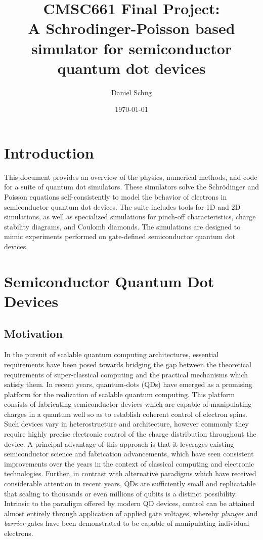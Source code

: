 \documentclass{article}
\title{CMSC661 Final Project: \\ A Schrodinger-Poisson based simulator for semiconductor quantum dot devices}
\author{Daniel Schug}
\date{\today}
\begin{document}
\maketitle
\tableofcontents
\newpage

\section{Introduction}
This document provides an overview of the physics, numerical methods, and code for a suite of quantum dot simulators. These simulators solve the Schrödinger and Poisson equations self-consistently to model the behavior of electrons in semiconductor quantum dot devices. The suite includes tools for 1D and 2D simulations, as well as specialized simulations for pinch-off characteristics, charge stability diagrams, and Coulomb diamonds. The simulations are designed to mimic experiments performed on gate-defined semiconductor quantum dot devices.

\section{Semiconductor Quantum Dot Devices}
\subsection{Motivation}
In the pursuit of scalable quantum computing architectures, essential requirements have been posed towards bridging the gap between the theoretical requirements of super-classical computing and the practical mechanisms which satisfy them. In recent years, quantum-dots (QDs) have emerged as a promising platform for the realization of scalable quantum computing. This platform consists of fabricating semiconductor devices which are capable of manipulating charges in a quantum well so as to establish coherent control of electron spins. Such devices vary in heterostructure and architecture, however commonly they require highly precise electronic control of the charge distribution throughout the device. A principal advantage of this approach is that it leverages existing semiconductor science and fabrication advancements, which have seen consistent improvements over the years in the context of classical computing and electronic technologies. Further, in contrast with alternative paradigms which have received considerable attention in recent years, QDs are sufficiently small and replicatable that scaling to thousands or even millions of qubits is a distinct possibility. Intrinsic to the paradigm offered by modern QD devices, control can be attained almost entirely through application of applied gate voltages, whereby \textit{plunger} and \textit{barrier} gates have been demonstrated to be capable of manipulating individual electrons.
\end{document}
